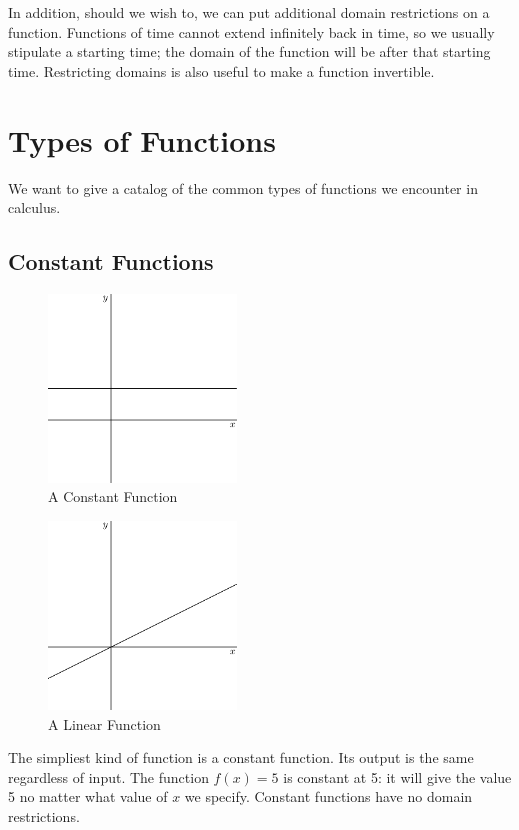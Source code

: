 \documentclass[fleqn]{report}
\begin{document}
In addition, should we wish to, we can put additional domain
restrictions on a function. Functions of time cannot extend
infinitely back in time, so we usually stipulate a starting
time; the domain of the function will be after that starting
time. Restricting domains is also useful to make a function
invertible.

\section{Types of Functions}
\label{types-of-functions}

We want to give a catalog of the common types of functions we
encounter in calculus.

\subsection{Constant Functions}
\label{constant-functions}

\begin{figure}[t]
\centering
\includegraphics[width=5cm]{figure26.eps}
\caption{A Constant Function}
\label{figure-constant-function}
\end{figure}

\begin{figure}[t]
\centering
\includegraphics[width=5cm]{figure27.eps}
\caption{A Linear Function}
\label{figure-linear-function}
\end{figure}

The simpliest kind of function is a constant function. Its
output is the same regardless of input. The function
$f(x) = 5$ is constant at 5: it will give the value 5 no
matter what value of $x$ we specify. Constant functions have
no domain restrictions.
\end{document}
